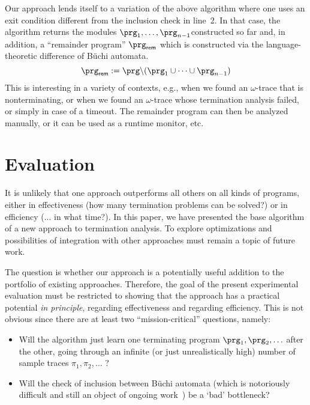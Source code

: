 Our approach lends itself to a variation of the above algorithm where one uses an exit condition different from the inclusion check in line~2.  In that case, the algorithm returns the modules $\prg_1,\dots,\prg_{n-1} $constructed so far and, in addition, a ``remainder program'' $\prg_\mathsf{rem}$ which is constructed via the language-theoretic difference of Büchi automata.
$$\prg_\mathsf{rem} := \prg \backslash (\prg_1\cup\dots\cup \prg_{n-1})$$
This is interesting in a variety of contexts, e.g., when we found an $\omega$-trace that is nonterminating, or when we found an $\omega$-trace whose termination analysis failed, or simply in case of a timeout.  The remainder program can then be analyzed manually, or it can be used as a runtime monitor, etc.





















\section{Evaluation}
\label{sec:evaluation}

It is unlikely that one approach outperforms all others on all kinds of programs, either in effectiveness (how many termination problems can be solved?) or in efficiency (... in what time?).
In this paper, we have presented the base algorithm of a new approach to termination analysis.
To explore optimizations and possibilities of integration with other approaches must remain a topic of future work.

The question is whether our approach is a potentially useful addition to the portfolio of existing approaches.
Therefore, the goal of the present experimental evaluation must be restricted to showing that the approach has a practical potential \emph{in principle}, regarding effectiveness and regarding efficiency.  
This is not obvious since there are at least two ``mission-critical'' questions, namely:
\begin{itemize}
 \item Will the algorithm just learn one terminating program $\prg_1, \prg_2, \ldots$ after the other, going through an infinite (or just unrealistically high) number of sample traces $\pi_1, \pi_2, \ldots$ ?
 \item Will the check of inclusion between Büchi automata (which is notoriously difficult and still an object of ongoing work~\cite{fossacs/BreuersLO12,conf/wia/TsaiFVT10}) be a `bad' bottleneck?
\end{itemize}


